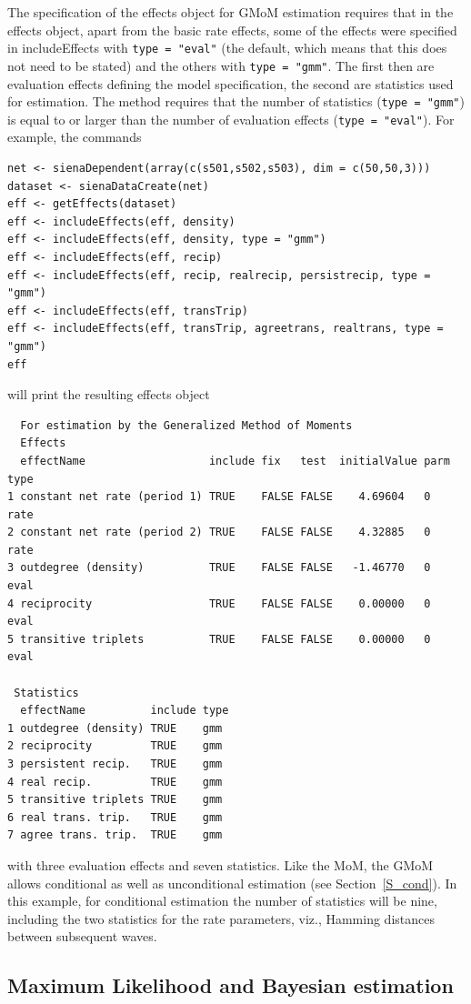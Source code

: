 \documentclass[a4paper,fleqn,11pt]{article}
\newcommand{\+}{\, + \,}
\newcommand{\sfn}[1]{\textsf{#1}}
\begin{document}
The specification of the effects object for GMoM estimation requires
that in the effects object, apart from the basic rate effects,
some of the effects were specified
in  \sfn{includeEffects} with \texttt{type = "eval"}
(the default, which means that this does not need to be stated)
and the others with \texttt{type = "gmm"}.
The first then are evaluation effects defining the model specification,
the second are statistics used for estimation.
The method requires that the number of statistics (\texttt{type = "gmm"})
is equal to or larger than the number of
evaluation effects (\texttt{type = "eval"}).
For example, the commands

\begin{verbatim}
net <- sienaDependent(array(c(s501,s502,s503), dim = c(50,50,3)))
dataset <- sienaDataCreate(net)
eff <- getEffects(dataset)
eff <- includeEffects(eff, density)
eff <- includeEffects(eff, density, type = "gmm")
eff <- includeEffects(eff, recip)
eff <- includeEffects(eff, recip, realrecip, persistrecip, type = "gmm")
eff <- includeEffects(eff, transTrip)
eff <- includeEffects(eff, transTrip, agreetrans, realtrans, type = "gmm")
eff
\end{verbatim}
will print the resulting effects object
\begin{verbatim}
  For estimation by the Generalized Method of Moments
  Effects
  effectName                   include fix   test  initialValue parm type
1 constant net rate (period 1) TRUE    FALSE FALSE    4.69604   0    rate
2 constant net rate (period 2) TRUE    FALSE FALSE    4.32885   0    rate
3 outdegree (density)          TRUE    FALSE FALSE   -1.46770   0    eval
4 reciprocity                  TRUE    FALSE FALSE    0.00000   0    eval
5 transitive triplets          TRUE    FALSE FALSE    0.00000   0    eval

 Statistics
  effectName          include type
1 outdegree (density) TRUE    gmm
2 reciprocity         TRUE    gmm
3 persistent recip.   TRUE    gmm
4 real recip.         TRUE    gmm
5 transitive triplets TRUE    gmm
6 real trans. trip.   TRUE    gmm
7 agree trans. trip.  TRUE    gmm
\end{verbatim}
with three evaluation effects and seven statistics.
Like the MoM, the GMoM allows conditional as well as unconditional
estimation (see Section~\ref{S_cond}).
In this example, for conditional estimation the number
of statistics will be nine, including the two statistics
for the rate parameters, viz., Hamming distances
between subsequent waves.

\subsection{Maximum Likelihood and Bayesian estimation}
\label{S_ML}
\label{S_Bayes}
\end{document}
